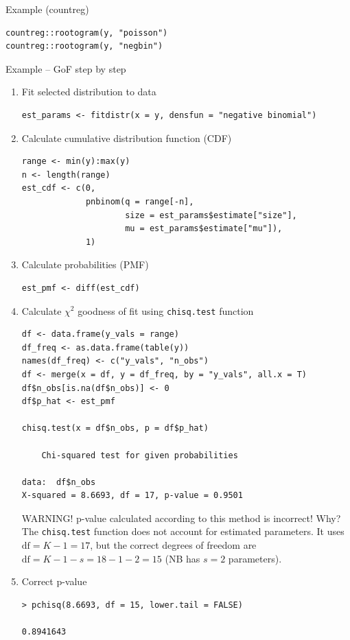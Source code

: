 \documentclass[10pt,ignorenonframetext,aspectratio=169]{beamer}
\begin{document}
\begin{frame}[fragile]{Example (countreg)}
\begin{verbatim}
countreg::rootogram(y, "poisson")
countreg::rootogram(y, "negbin")
\end{verbatim}
\end{frame}

\begin{frame}{Example -- GoF step by step}
\begin{enumerate}
    \item Fit selected distribution to data
    \begin{verbatim}
est_params <- fitdistr(x = y, densfun = "negative binomial")        
    \end{verbatim}
    \item Calculate cumulative distribution function (CDF)
    \begin{verbatim}
range <- min(y):max(y)
n <- length(range)
est_cdf <- c(0, 
             pnbinom(q = range[-n], 
                     size = est_params$estimate["size"], 
                     mu = est_params$estimate["mu"]),
             1)
    \end{verbatim}
    \item Calculate probabilities (PMF)
    \begin{verbatim}
est_pmf <- diff(est_cdf)
    \end{verbatim}
\item Calculate $\chi^2$ goodness of fit using \texttt{chisq.test} function
\begin{verbatim}
df <- data.frame(y_vals = range)
df_freq <- as.data.frame(table(y))
names(df_freq) <- c("y_vals", "n_obs")
df <- merge(x = df, y = df_freq, by = "y_vals", all.x = T)
df$n_obs[is.na(df$n_obs)] <- 0
df$p_hat <- est_pmf

chisq.test(x = df$n_obs, p = df$p_hat)

	Chi-squared test for given probabilities

data:  df$n_obs
X-squared = 8.6693, df = 17, p-value = 0.9501
\end{verbatim}

\alert{WARNING!} p-value calculated according to this method is incorrect! Why? The \texttt{chisq.test} function does not account for estimated parameters. It uses $\text{df} = K - 1 = 17$, but the correct degrees of freedom are $\text{df} = K - 1 - s = 18 - 1 - 2 = 15$ (NB has $s=2$ parameters).

\item Correct p-value 

\begin{verbatim}
> pchisq(8.6693, df = 15, lower.tail = FALSE)

0.8941643

\end{verbatim}
\end{enumerate}
\end{frame}
\end{document}
